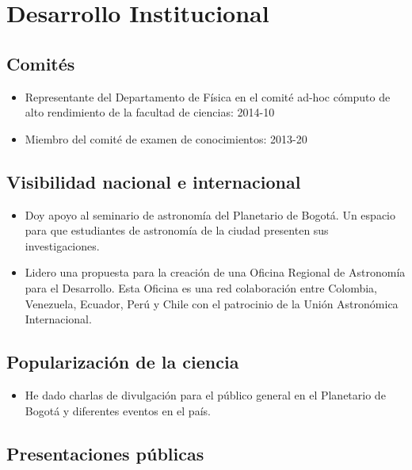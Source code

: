 \documentclass{article}
\begin{document}
\section{Desarrollo Institucional}

\subsection{Comit\'es}
\begin{itemize}
\item {Representante del Departamento de F\'isica en el comit\'e
  ad-hoc c\'omputo de alto rendimiento de la facultad de ciencias}:
  2014-10  
\item {Miembro del comit\'e de examen de conocimientos}: 2013-20 
\end{itemize}


\subsection{Visibilidad nacional e internacional}
\begin{itemize}
\item {Doy apoyo al seminario de astronom\'ia del Planetario de
  Bogot\'a. Un espacio para que estudiantes de astronom\'ia de la
  ciudad presenten sus investigaciones.}  
\item {Lidero una propuesta para la creaci\'on de una Oficina Regional
  de Astronom\'ia para el Desarrollo. Esta Oficina es una red
  colaboraci\'on entre Colombia, Venezuela, Ecuador, Per\'u y Chile
  con el patrocinio de la Uni\'on Astron\'omica Internacional.}  
\end{itemize}

\subsection{Popularizaci\'on de la ciencia}
\begin{itemize}
\item {He dado charlas de divulgaci\'on para el p\'ublico general en
  el Planetario de Bogot\'a y diferentes eventos en el pa\'is.} 
\end{itemize}

\subsection{Presentaciones p\'ublicas}
\end{document}
